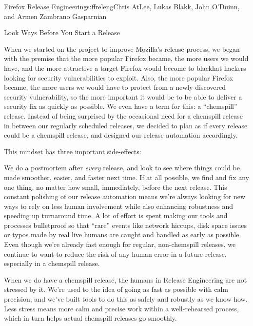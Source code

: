 \begin{aosachapter}{Firefox Release Engineering}{s:ffreleng}{Chris AtLee, Lukas Blakk, John O'Duinn, and Armen Zambrano Gasparnian}
\begin{aosasect1}{Look  Ways Before You Start a Release}

When we started on the project to improve Mozilla's release process,
we began with the premise that the more popular Firefox became, the
more users we would have, and the more attractive a target Firefox would
become to blackhat hackers looking for security vulnerabilities to
exploit. Also, the more popular Firefox became, the more users we
would have to protect from a newly discovered security vulnerability,
so the more important it would be to be able to deliver a security fix as quickly
as possible. We even have a term for this: a ``chemspill''
release. Instead of being surprised by the occasional need for a
chemspill release in between our regularly scheduled releases, we
decided to plan as if every release could be a chemspill release, and
designed our release automation accordingly.

This mindset has three important side-effects:

\begin{aosaenumerate}

\item We do a postmortem after \emph{every} release, and look to see
  where things could be made smoother, easier, and faster next
  time. If at all possible, we find and fix any one thing,
  no matter how small, immediately, before the next release. This constant
  polishing of our release automation means we're always looking for
  new ways to rely on less human involvement while also enhancing
  robustness and speeding up turnaround time. A lot of effort is spent
  making our tools and processes bulletproof so that ``rare'' events
  like network hiccups, disk space issues or typos made by real live
  humans are caught and handled as early as possible.  Even though
  we're already fast enough for regular, non-chemspill releases, we
  continue to want to reduce the risk of any human error in a future
  release, especially in a chemspill release.

\item When we do have a chemspill release, the humans in Release
  Engineering are not stressed by it. We're used to the idea of going
  as fast as possible with calm precision, and we've built tools to do
  this as safely and robustly as we know how. Less stress means more
  calm and precise work within a well-rehearsed process, which in turn
  helps actual chemspill releases go smoothly.


\end{aosaenumerate}
\end{aosasect1}
\end{aosachapter}
